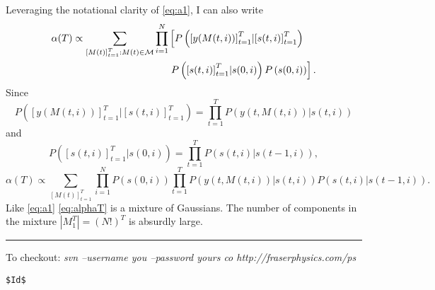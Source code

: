 \documentclass[11pt]{article}
\newcommand{\M}{{\cal M}}
\newcommand{\os}[4]{{\left[ #1(#2) \right]}_{#3}^{#4}} %
\newcommand{\ti}[2]{{#1}{(#2)}}                         %
\newcommand{\ts}[4]{{#1}_{#3}^{#4}} %
\begin{document}
Leveraging the notational clarity of \eqref{eq:a1}, I can also write
\begin{align*}
  \ti{\alpha}{T} \propto \sum_{\os{M}{t}{t=1}{T}:\ti{M}{t}\in \M}
  \prod_{i=1}^N& \left[
  P\left( \os{y}{\ti{M}{t,i}}{t=1}{T} | \os{s}{t,i}{t=1}{T}\right) \right. \\
  & \left. P\left( \os{s}{t,i}{t=1}{T}| \ti{s}{0,i} \right)
  P\left( \ti{s}{0,i} \right) \right] .
\end{align*}
Since
\begin{equation*}
  P\left( \os{y}{\ti{M}{t,i}}{t=1}{T} | \os{s}{t,i}{t=1}{T}\right) =
  \prod_{t=1}^T P\left( \ti{y}{t,\ti{M}{t,i}} | \ti{s}{t,i}\right)
\end{equation*}
and
\begin{equation*}
  P\left( \os{s}{t,i}{t=1}{T}| \ti{s}{0,i} \right) = \prod_{t=1}^T
  P\left( \ti{s}{t,i} | \ti{s}{t-1,i}\right),
\end{equation*}
\begin{equation}
  \label{eq:alphaT}
  \ti{\alpha}{T} \propto \sum_{\os{M}{t}{t=1}{T}}
  \prod_{i=1}^N  P\left( \ti{s}{0,i} \right) \prod_{t=1}^T
  P\left( \ti{y}{t,\ti{M}{t,i}} | \ti{s}{t,i}\right)
  P\left( \ti{s}{t,i} | \ti{s}{t-1,i}\right).
\end{equation}
Like \eqref{eq:a1} \eqref{eq:alphaT} is a mixture of Gaussians.  The
number of components in the mixture $\left| \ts{M}{t}{1}{T}\right| =
(N!)^T$ is absurdly large.

\vfill \hrule To checkout: \emph{ svn --username you --password yours
  co http://fraserphysics.com/ps}
\begin{verbatim}
$Id$
\end{verbatim}
\end{document}
